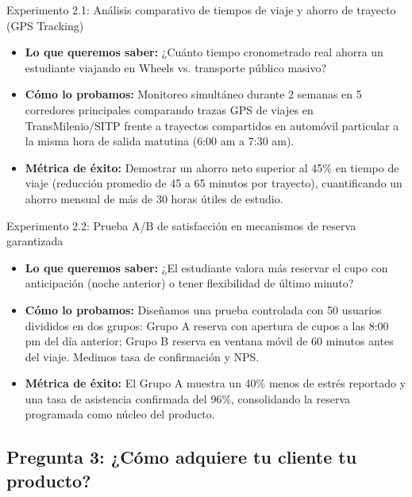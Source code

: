\documentclass[11pt,a4paper]{article}
\begin{document}
\begin{kbibox}{Experimento 2.1: Análisis comparativo de tiempos de viaje y ahorro de trayecto (GPS Tracking)}
\begin{itemize}[leftmargin=*]
    \item \textbf{Lo que queremos saber:} ¿Cuánto tiempo cronometrado real ahorra un estudiante viajando en Wheels vs. transporte público masivo?
    \item \textbf{Cómo lo probamos:} Monitoreo simultáneo durante 2 semanas en 5 corredores principales comparando trazas GPS de viajes en TransMilenio/SITP frente a trayectos compartidos en automóvil particular a la misma hora de salida matutina (6:00 am a 7:30 am).
    \item \textbf{Métrica de éxito:} Demostrar un ahorro neto superior al 45\% en tiempo de viaje (reducción promedio de 45 a 65 minutos por trayecto), cuantificando un ahorro mensual de más de 30 horas útiles de estudio.
\end{itemize}
\end{kbibox}

\begin{kbibox}{Experimento 2.2: Prueba A/B de satisfacción en mecanismos de reserva garantizada}
\begin{itemize}[leftmargin=*]
    \item \textbf{Lo que queremos saber:} ¿El estudiante valora más reservar el cupo con anticipación (noche anterior) o tener flexibilidad de último minuto?
    \item \textbf{Cómo lo probamos:} Diseñamos una prueba controlada con 50 usuarios divididos en dos grupos: Grupo A reserva con apertura de cupos a las 8:00 pm del día anterior; Grupo B reserva en ventana móvil de 60 minutos antes del viaje. Medimos tasa de confirmación y NPS.
    \item \textbf{Métrica de éxito:} El Grupo A muestra un 40\% menos de estrés reportado y una tasa de asistencia confirmada del 96\%, consolidando la reserva programada como núcleo del producto.
\end{itemize}
\end{kbibox}

\subsection{Pregunta 3: ¿Cómo adquiere tu cliente tu producto?}
\end{document}

